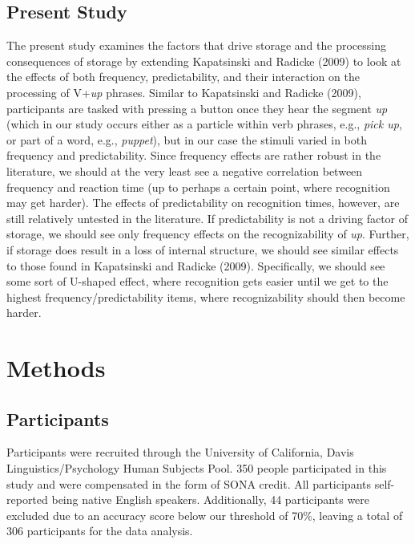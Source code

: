 \documentclass[
  man,floatsintext]{apa6}
\begin{document}
\subsection{Present Study}\label{present-study}

The present study examines the factors that drive storage and the processing consequences of storage by extending Kapatsinski and Radicke (2009) to look at the effects of both frequency, predictability, and their interaction on the processing of V+\emph{up} phrases. Similar to Kapatsinski and Radicke (2009), participants are tasked with pressing a button once they hear the segment \emph{up} (which in our study occurs either as a particle within verb phrases, e.g., \emph{pick up}, or part of a word, e.g., \emph{puppet}), but in our case the stimuli varied in both frequency and predictability. Since frequency effects are rather robust in the literature, we should at the very least see a negative correlation between frequency and reaction time (up to perhaps a certain point, where recognition may get harder). The effects of predictability on recognition times, however, are still relatively untested in the literature. If predictability is not a driving factor of storage, we should see only frequency effects on the recognizability of \emph{up}. Further, if storage does result in a loss of internal structure, we should see similar effects to those found in Kapatsinski and Radicke (2009). Specifically, we should see some sort of U-shaped effect, where recognition gets easier until we get to the highest frequency/predictability items, where recognizability should then become harder.

\section{Methods}\label{methods}

\subsection{Participants}\label{participants}

Participants were recruited through the University of California, Davis Linguistics/Psychology Human Subjects Pool. 350 people participated in this study and were compensated in the form of SONA credit. All participants self-reported being native English speakers. Additionally, 44 participants were excluded due to an accuracy score below our threshold of 70\%, leaving a total of 306 participants for the data analysis.
\end{document}
